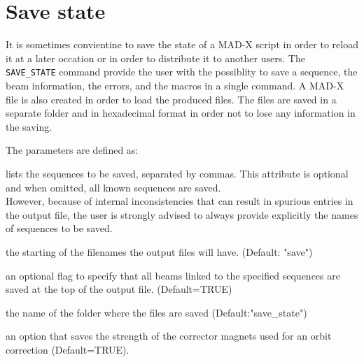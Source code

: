 \chapter{Save state}
\label{chap:savestate}  
It is sometimes convientine to save the state of a MAD-X script in order to reload it at a later occation or in order to distribute it to another users. 
The \texttt{SAVE\_STATE} command provide the user with the possiblity to save a sequence, the beam information, the errors, and the macros in a single command. 
A MAD-X file is also created in order to load the produced files. The files are saved in a separate folder and in hexadecimal format in order not to lose
any information in the saving.


The parameters are defined as: 
\begin{madlist}
   lists the sequences to be saved, separated by commas. 
  This attribute is optional and when omitted, all known 
  sequences are saved. \\
  However, because of internal inconsistencies that can result in spurious 
  entries in the output file, the user is strongly advised to always provide 
  explicitly the names of sequences to be saved.

   the starting of the filenames the output files will have. (Default: "save")

   an optional flag to specify that all beams linked to the
  specified sequences are saved at the top of the output file. (Default=TRUE)

   the name of the folder where the files are saved (Default:"save\_state")

   an option that saves the strength of the corrector magnets used
  for an orbit correction (Default=TRUE). 

\end{madlist}




